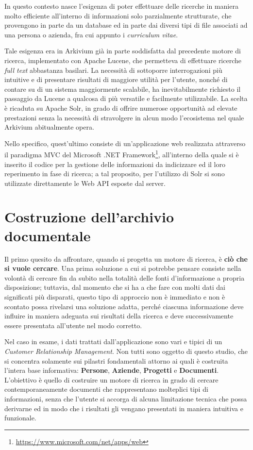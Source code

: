 In questo contesto nasce l’esigenza di poter effettuare delle ricerche in maniera molto efficiente all’interno di informazioni solo parzialmente strutturate, che provengono in parte da un database ed in parte dai diversi tipi di file associati ad una persona o azienda, fra cui appunto i \textit{curriculum vitae}.

Tale esigenza era in Arkivium già in parte soddisfatta dal precedente motore di ricerca, implementato con Apache Lucene, che permetteva di effettuare ricerche \textit{full text} abbastanza basilari. La necessità di sottoporre interrogazioni più intuitive e di presentare risultati di maggiore utilità per l’utente, nonché di contare su di un sistema maggiormente scalabile, ha inevitabilmente richiesto il passaggio da Lucene a qualcosa di più versatile e facilmente utilizzabile. La scelta è ricaduta su Apache Solr, in grado di offrire numerose opportunità ad elevate prestazioni senza la necessità di stravolgere in alcun modo l’ecosistema nel quale Arkivium abitualmente opera.

\vspace{1em}

Nello specifico, quest’ultimo consiste di un’applicazione web realizzata attraverso il paradigma MVC del Microsoft .NET Framework\footnote{\url{https://www.microsoft.com/net/apps/web}}, all’interno della quale si è inserito il codice per la gestione delle informazioni da indicizzare ed il loro reperimento in fase di ricerca; a tal proposito, per l’utilizzo di Solr si sono utilizzate direttamente le Web API esposte dal server.




\section{Costruzione dell'archivio documentale}

Il primo quesito da affrontare, quando si progetta un motore di ricerca, è \textbf{ciò che si vuole cercare}. Una prima soluzione a cui si potrebbe pensare consiste nella volontà di cercare fin da subito nella totalità delle fonti d’informazione a propria disposizione; tuttavia, dal momento che si ha a che fare con molti dati dai significati più disparati, questo tipo di approccio non è immediato e non è scontato possa rivelarsi una soluzione adatta, perché ciascuna informazione deve influire in maniera adeguata sui risultati della ricerca e deve successivamente essere presentata all’utente nel modo corretto.

Nel caso in esame, i dati trattati dall’applicazione sono vari e tipici di un \textit{Customer Relationship Management}. Non tutti sono oggetto di questo studio, che si concentra solamente sui pilastri fondamentali attorno ai quali è costruita l’intera base informativa: \textbf{Persone}, \textbf{Aziende}, \textbf{Progetti} e \textbf{Documenti}. L’obiettivo è quello di costruire un motore di ricerca in grado di cercare contemporaneamente documenti che rappresentano molteplici tipi di informazioni, senza che l’utente si accorga di alcuna limitazione tecnica che possa derivarne ed in modo che i risultati gli vengano presentati in maniera intuitiva e funzionale.

